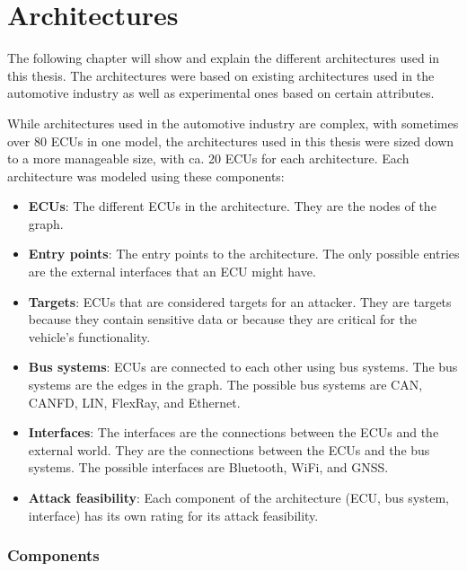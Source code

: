 \chapter{Architectures}
\label{chp:arch}

The following chapter will show and explain the different architectures used in this thesis.
The architectures were based on existing architectures used in the automotive industry as well as experimental ones based on certain attributes.

While architectures used in the automotive industry are complex, with sometimes over 80 ECUs in one model, 
the architectures used in this thesis were sized down to a more manageable size, with ca. 20 ECUs for each architecture.
Each architecture was modeled using these components:

\begin{itemize}

    \item \textbf{ECUs}: The different ECUs in the architecture. They are the nodes of the graph.
    
    \item \textbf{Entry points}: The entry points to the architecture. The only possible entries are the external interfaces that an ECU might have.
    
    \item \textbf{Targets}: ECUs that are considered targets for an attacker. They are targets because they contain sensitive data or because they are critical for the vehicle's functionality.
    
    \item \textbf{Bus systems}: ECUs are connected to each other using bus systems. The bus systems are the edges in the graph. The possible bus systems are CAN, CANFD, LIN, FlexRay, and Ethernet.
    
    \item \textbf{Interfaces}: The interfaces are the connections between the ECUs and the external world. They are the connections between the ECUs and the bus systems. The possible interfaces are Bluetooth, WiFi, and GNSS.
    
    \item \textbf{Attack feasibility}: Each component of the architecture (ECU, bus system, interface) has its own rating for its attack feasibility.

\end{itemize}

\subsection{Components}
\label{components}

